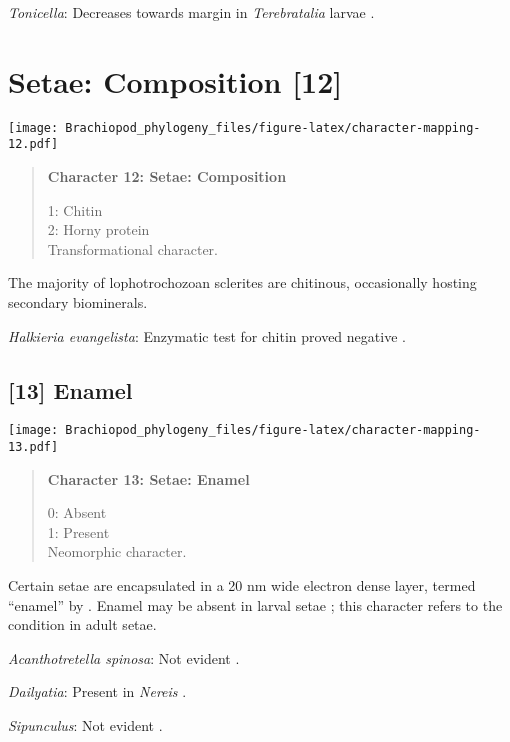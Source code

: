 \documentclass[openany]{book}
\theoremstyle{definition}
\theoremstyle{definition}
\theoremstyle{definition}
\theoremstyle{remark}
\begin{document}
\hypertarget{Tonicella-coding-11}{}
\emph{Tonicella}: Decreases towards margin in \emph{Terebratalia} larvae
\citep{Gustus1972}.

\section{Setae: Composition {[}12{]}}\label{setae-composition-12}

\texttt{[image: Brachiopod\_phylogeny\_files/figure-latex/character-mapping-12.pdf]}

\begin{quote}
\textbf{Character 12: Setae: Composition}

1: Chitin\\
2: Horny protein\\
Transformational character.
\end{quote}

The majority of lophotrochozoan sclerites are chitinous, occasionally
hosting secondary biominerals.

\hypertarget{Halkieria_evangelista-coding-12}{}
\emph{Halkieria evangelista}: Enzymatic test for chitin proved negative
\citep{Rice1993}.

\subsection*{{[}13{]} Enamel}\label{enamel}

\texttt{[image: Brachiopod\_phylogeny\_files/figure-latex/character-mapping-13.pdf]}

\begin{quote}
\textbf{Character 13: Setae: Enamel}

0: Absent\\
1: Present\\
Neomorphic character.
\end{quote}

Certain setae are encapsulated in a 20 nm wide electron dense layer,
termed ``enamel'' by \citet{Gustus1973}. Enamel may be absent in larval
setae \citep{Luter2003}; this character refers to the condition in adult
setae.

\hypertarget{Acanthotretella_spinosa-coding-13}{}
\emph{Acanthotretella spinosa}: Not evident
\citep{Leise1988, Fischer1980}.

\hypertarget{Dailyatia-coding-13}{}
\emph{Dailyatia}: Present in \emph{Nereis} \citep{Gustus1973}.

\hypertarget{Sipunculus-coding-13}{}
\emph{Sipunculus}: Not evident \citep{Gordon1975}.
\end{document}
